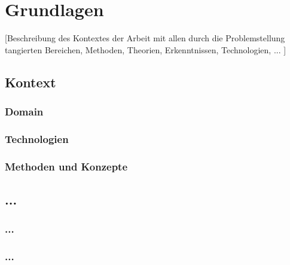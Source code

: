\chapter{Grundlagen}
[Beschreibung des Kontextes der Arbeit mit allen durch die Problemstellung tangierten Bereichen, Methoden, Theorien, Erkenntnissen, Technologien, ... ] 


\section{Kontext}


\subsection{Domain} 



\subsection{Technologien}


\subsection{Methoden und Konzepte}


\section{...}


\subsection{...}


\subsection{...}